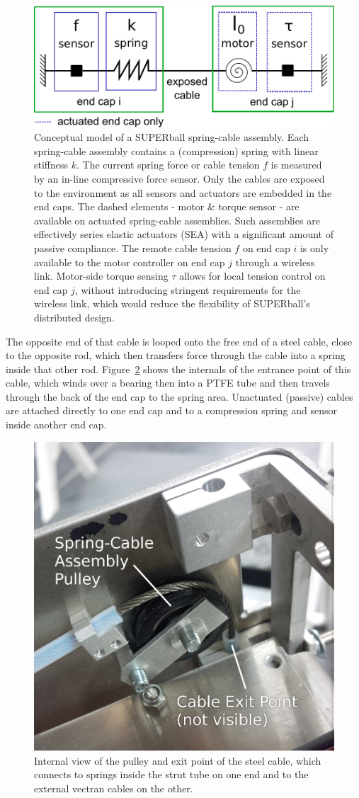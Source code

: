 \documentclass[12pt]{report}
\begin{document}
\begin{figure}[thpb]
      \centering
      \includegraphics[width=.5\columnwidth]{img/spring_assembly.pdf}
      \caption{Conceptual model of a SUPERball spring-cable assembly. 
Each spring-cable assembly contains a (compression) spring with linear stiffness $k$. 
The current spring force or cable tension $f$ is measured by an in-line compressive force sensor.
Only the cables are exposed to the environment as all sensors and actuators are embedded in the end caps. 
The dashed elements - motor \& torque sensor - are available on actuated spring-cable assemblies.
Such assemblies are effectively series elastic actuators (SEA) with a significant amount of passive compliance.
The remote cable tension $f$ on end cap $i$ is only available to the motor controller on end cap $j$ through a wireless link.
Motor-side torque sensing $\tau$ allows for local tension control on end cap $j$, without introducing stringent requirements for the wireless link, which would reduce the flexibility of SUPERball's distributed design.
}
      \label{fig:springcable}
\end{figure}

The opposite end of that cable is looped onto the free end of a steel cable, close to the opposite rod, which then transfers force through the cable into a spring inside that other rod.
Figure~\ref{fig:cable_pulley_bearing_internals} shows the internals of the entrance point of this cable, which winds over a bearing then into a PTFE tube and then travels through the back of the end cap to the spring area.
Unactuated (passive) cables are attached directly to one end cap and to a compression spring and sensor inside another end cap.

\begin{figure}[thpb]
      \centering
      \includegraphics[width=.5\columnwidth]{img/cable_pulley_bearing_labelled.jpg}
      \caption{Internal view of the pulley and exit point of the steel cable, which connects to springs inside the strut tube on one end and to the external vectran cables on the other.}
      \label{fig:cable_pulley_bearing_internals}
      \vspace{-0.2cm}
\end{figure}
\end{document}
